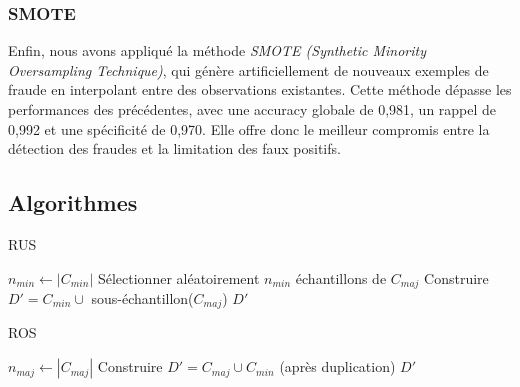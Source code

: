 \documentclass{article}
\begin{document}
\subsubsection*{SMOTE}
Enfin, nous avons appliqué la méthode \textit{SMOTE (Synthetic Minority Oversampling Technique)}, qui génère artificiellement de nouveaux exemples de fraude en interpolant entre des observations existantes.
Cette méthode dépasse les performances des précédentes, avec une accuracy globale de 0,981, un rappel de 0,992 et une spécificité de 0,970.
Elle offre donc le meilleur compromis entre la détection des fraudes et la limitation des faux positifs.


\vspace{1cm}


\subsection{Algorithmes}

\begin{algorithm}[H]
\caption{RUS}

$n_{min} \gets |C_{min}|$ \;
Sélectionner aléatoirement $n_{min}$ échantillons de $C_{maj}$\;
Construire $D' = C_{min} \cup$ sous-échantillon($C_{maj}$)\;
\Return $D'$\;
\end{algorithm}

\vspace{1cm}

\begin{algorithm}[H]
\caption{ROS}

$n_{maj} \gets |C_{maj}|$ \;
Construire $D' = C_{maj} \cup C_{min}$ (après duplication)\;
\Return $D'$\;
\end{algorithm}

\vspace{1cm}
\end{document}
